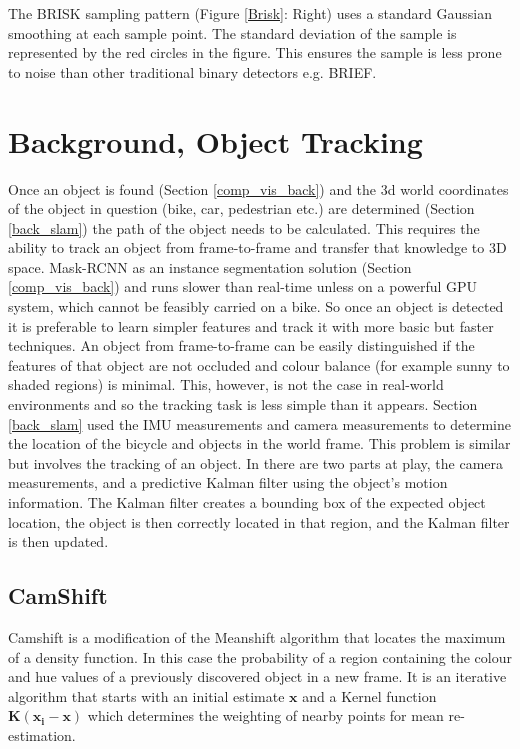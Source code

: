 \documentclass[a4paper,11pt,notitlepage]{article}
\begin{document}
The BRISK sampling pattern (Figure \ref{Brisk}: Right) uses a standard Gaussian smoothing at each sample point. The standard deviation of the sample is represented by the red circles in the figure. This ensures the sample is less prone to noise than other traditional binary detectors e.g. BRIEF.


\section{Background, Object Tracking}

Once an object is found (Section \ref{comp_vis_back}) and the 3d world coordinates of the object in question (bike, car, pedestrian etc.) are determined (Section \ref{back_slam}) the path of the object needs to be calculated. This requires the ability to track an object from frame-to-frame and transfer that knowledge to 3D space. Mask-RCNN as an instance segmentation solution (Section \ref{comp_vis_back}) and runs slower than real-time unless on a powerful GPU system, which cannot be feasibly carried on a bike. So once an object is detected it is preferable to learn simpler features and track it with more basic but faster techniques. An object from frame-to-frame can be easily distinguished if the features of that object are not occluded and colour balance (for example sunny to shaded regions) is minimal. This, however, is not the case in real-world environments and so the tracking task is less simple than it appears.
\newline \newline
Section \ref{back_slam} used the IMU measurements and camera measurements to determine the location of the bicycle and objects in the world frame. This problem is similar but involves the tracking of an object. In \cite{Ped_tract} there are two parts at play, the camera measurements, and a predictive Kalman filter using the object's motion information. The Kalman filter creates a bounding box of the expected object location, the object is then correctly located in that region, and the Kalman filter is then updated.



\subsection{CamShift}

Camshift is a modification of the Meanshift algorithm that locates the maximum of a density function. In this case the probability of a region containing the colour and hue values of a previously discovered object in a new frame. It is an iterative algorithm that starts with an initial estimate $\mathbf{x}$ and a Kernel function $\mathbf{K}(\mathbf{x_{i}} - \mathbf{x})$ which determines the weighting of nearby points for mean re-estimation.
\end{document}
